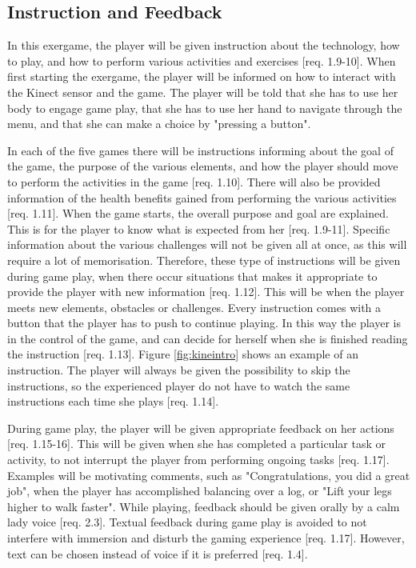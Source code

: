 \subsection{Instruction and Feedback}
In this exergame, the player will be given instruction about the technology, how to play, and how to perform various activities and exercises [req. 1.9-10]. When first starting the exergame, the player will be informed on how to interact with the Kinect sensor and the game. The player will be told that she has to use her body to engage game play, that she has to use her hand to navigate through the menu, and that she can make a choice by "pressing a button". 

In each of the five games there will be instructions informing about the goal of the game, the purpose of the various elements, and how the player should move to perform the activities in the game [req. 1.10]. There will also be provided information of the health benefits gained from performing the various activities [req. 1.11]. When the game starts, the overall purpose and goal are explained. This is for the player to know what is expected from her [req. 1.9-11]. Specific information about the various challenges will not be given all at once, as this will require a lot of memorisation. Therefore, these type of instructions will be given during game play, when there occur situations that makes it appropriate to provide the player with new information [req. 1.12]. This will be when the player meets new elements, obstacles or challenges. Every instruction comes with a button that the player has to push to continue playing. In this way the player is in the control of the game, and can decide for herself when she is finished reading the instruction [req. 1.13]. Figure \ref{fig:kineintro} shows an example of an instruction. The player will always be given the possibility to skip the instructions, so the experienced player do not have to watch the same instructions each time she plays [req. 1.14].

During game play, the player will be given appropriate feedback on her actions [req. 1.15-16]. This will be given when she has completed a particular task or activity, to not interrupt the player from performing ongoing tasks [req. 1.17]. Examples will be motivating comments, such as "Congratulations, you did a great job", when the player has accomplished balancing over a log, or "Lift your legs higher to walk faster". While playing, feedback should be given orally by a calm lady voice [req. 2.3]. Textual feedback during game play is avoided to not interfere with immersion and disturb the gaming experience [req. 1.17].  However, text can be chosen instead of voice if it is preferred [req. 1.4]. 

